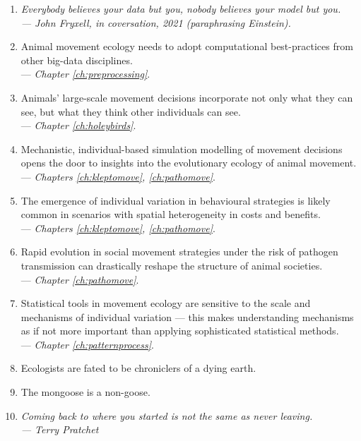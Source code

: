\begin{onehalfspace}
    \begin{enumerate}
        \item \textit{Everybody believes your data but you, nobody believes your model but you.\\ --- John Fryxell, in coversation, 2021 (paraphrasing Einstein).}

        \item Animal movement ecology needs to adopt computational best-practices from other big-data disciplines.\\ --- \textit{Chapter \ref{ch:preprocessing}}.

        \item Animals' large-scale movement decisions incorporate not only what they can see, but what they think other individuals can see.\\ --- \textit{Chapter \ref{ch:holeybirds}}.

        \item Mechanistic, individual-based simulation modelling of movement decisions opens the door to insights into the evolutionary ecology of animal movement. \\ --- \textit{Chapters \ref{ch:kleptomove}, \ref{ch:pathomove}}.
        
        \item The emergence of individual variation in behavioural strategies is likely common in scenarios with spatial heterogeneity in costs and benefits.\\ --- \textit{Chapters \ref{ch:kleptomove}, \ref{ch:pathomove}}.

        \item Rapid evolution in social movement strategies under the risk of pathogen transmission can drastically reshape the structure of animal societies.\\ --- \textit{Chapter \ref{ch:pathomove}}.
        
        \item Statistical tools in movement ecology are sensitive to the scale and mechanisms of individual variation --- this makes understanding mechanisms as if not more important than applying sophisticated statistical methods.\\ --- \textit{Chapter \ref{ch:patternprocess}}.
        
        \item Ecologists are fated to be chroniclers of a dying earth.
        
        \item The mongoose is a non-goose.

        \item \textit{Coming back to where you started is not the same as never leaving.\\--- Terry Pratchet}
    \end{enumerate}

\end{onehalfspace}

\endgroup

\vfill

\clearpage
